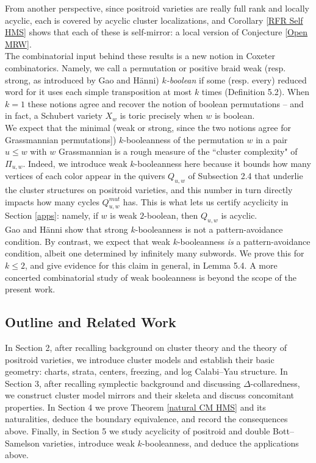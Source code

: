 \documentclass[11pt]{amsart}
\theoremstyle{definition}
\theoremstyle{remark}
\numberwithin{equation}{section}
\begin{document}
From another perspective, since positroid varieties are really full rank and locally acyclic, each is covered by acyclic cluster localizations, and Corollary \ref{RFR Self HMS} shows that each of these is self-mirror: a local version of Conjecture \ref{Open MRW}.\\

The combinatorial input behind these results is a new notion in Coxeter combinatorics. Namely, we call a permutation or positive braid weak (resp. strong, as introduced by Gao and H\"{a}nni) \textit{$k$-boolean} if some (resp. every) reduced word for it uses each simple transposition at most $k$ times (Definition 5.2). When $k = 1$ these notions agree and recover the notion of boolean permutations -- and in fact, a Schubert variety $X_w$ is toric precisely when $w$ is boolean.\\

We expect that the minimal (weak or strong, since the two notions agree for Grassmannian permutations]) $k$-booleanness of the permutation $w$ in a pair $u \leq w$ with $w$ Grassmannian is a rough measure of the ``cluster complexity" of $\Pi_{u,w}$. Indeed, we introduce weak $k$-booleanness here because it bounds how many vertices of each color appear in the quivers $Q_{u,w}$ of Subsection 2.4 that underlie the cluster structures on positroid varieties, and this number in turn directly impacts how many cycles $Q_{u,w}^{mut}$ has. This is what lets us certify acyclicity in Section \ref{apps}: namely, if $w$ is weak $2$-boolean, then $Q_{u,w}$ is acyclic.\\

Gao and H\"{a}nni show that strong $k$-booleanness is not a pattern-avoidance condition. By contrast, we expect that weak $k$-booleanness \textit{is} a pattern-avoidance condition, albeit one determined by infinitely many subwords. We prove this for $k \le 2$, and give evidence for this claim in general, in Lemma 5.4. A more concerted combinatorial study of weak booleanness is beyond the scope of the present work.

\subsection{Outline and Related Work}

In Section 2, after recalling background on cluster theory and the theory of positroid varieties, we introduce cluster models and establish their basic geometry: charts, strata, centers, freezing, and log Calabi–Yau structure. In Section 3, after recalling symplectic background and discussing $\Delta$-collaredness, we construct cluster model mirrors and their skeleta and discuss concomitant properties. In Section 4 we prove Theorem \ref{natural CM HMS} and its naturalities, deduce the boundary equivalence, and record the consequences above. Finally, in Section 5 we study acyclicity of positroid and double Bott–Samelson varieties, introduce weak $k$-booleanness, and deduce the applications above.\\
\end{document}
